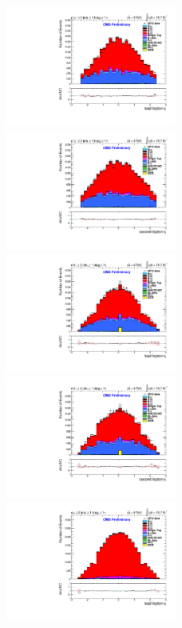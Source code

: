 \documentclass[oneside, a4paper, 11pt, ]{report}
\begin{document}
\begin{figure}
\includegraphics[width=0.5\textwidth]{Plots/ControlPlots/TTbarDiLeptonAnalysis/MuMu/DiLepton/LeadLepton_Eta_splitTTbar_ratio.pdf}
\includegraphics[width=0.5\textwidth]{Plots/ControlPlots/TTbarDiLeptonAnalysis/MuMu/DiLepton/SecondLepton_Eta_splitTTbar_ratio.pdf}\\
\includegraphics[width=0.5\textwidth]{Plots/ControlPlots/TTbarDiLeptonAnalysis/EE/DiLepton/LeadLepton_Eta_splitTTbar_ratio.pdf}
\includegraphics[width=0.5\textwidth]{Plots/ControlPlots/TTbarDiLeptonAnalysis/EE/DiLepton/SecondLepton_Eta_splitTTbar_ratio.pdf}\\
\includegraphics[width=0.5\textwidth]{Plots/ControlPlots/TTbarDiLeptonAnalysis/EMu/DiLepton/LeadLepton_Eta_splitTTbar_ratio.pdf}

\end{figure}
\end{document}

